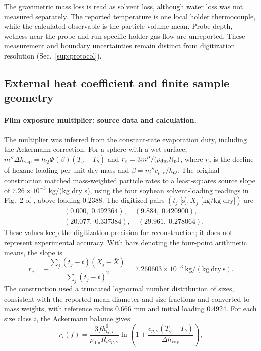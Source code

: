 The gravimetric mass loss is read as solvent loss, although water loss was
not measured separately. The reported temperature is one local holder
thermocouple, while the calculated observable is the particle volume mean.
Probe depth, wetness near the probe and run-specific holder gas flow are
unreported. These measurement and boundary uncertainties remain distinct
from digitization resolution (Sec.~\ref{sup:protocol}).

\subsection{External heat coefficient and finite sample geometry}
\label{sup:detail:geometry}
\paragraph{Film exposure multiplier: source data and calculation.}
\label{sup:fanermultiplier}
The multiplier was inferred from the constant-rate evaporation duty, including the Ackermann correction. For a
sphere with a wet surface,
$m''\Delta h_{\mathrm{vap}}=h_Q\Phi(\beta)(T_g-T_b)$ and
$r_c=3m''/(\rho_{\mathrm{dm}}R_{\mathrm{p}})$, where $r_c$ is the decline of
hexane loading per unit dry mass and $\beta=m''c_{p,\mathrm v}/h_Q$.
The original construction matched mass-weighted particle rates to a
least-squares source slope of $7.26\times10^{-3}$ kg/(kg dry s), using
the four soybean solvent-loading readings in Fig.~2 of
\citet{faner2019kinetics}, above loading 0.2388. The digitized pairs
$(t_j\text{ [s]},X_j\text{ [kg/kg dry]})$ are
\[
\begin{aligned}
 &(0.000,\;0.492364),\quad(9.884,\;0.420900),\\
 &(20.077,\;0.337384),\quad(29.961,\;0.278064).
\end{aligned}
\]
These values keep the digitization precision for reconstruction; it does
not represent experimental accuracy.
With bars denoting the four-point arithmetic means, the slope is
\[
r_c=-\frac{\sum_j(t_j-\bar t)(X_j-\bar X)}
                  {\sum_j(t_j-\bar t)^2}
    =7.260603\times10^{-3}\ \mathrm{kg/(kg\ dry\ s)}.
\]
The construction used a truncated lognormal number distribution of sizes,
consistent with the reported mean diameter and size fractions and converted
to mass weights, with reference radius 0.666 mm and initial loading 0.4924.
For each size class $i$, the Ackermann balance gives
\[
r_i(f)=\frac{3f h^0_{Q,i}}{\rho_{\mathrm{dm}}R_i c_{p,\mathrm v}}
 \ln\!\left(1+\frac{c_{p,\mathrm v}(T_g-T_b)}
 {\Delta h_{\mathrm{vap}}}\right),
\]
